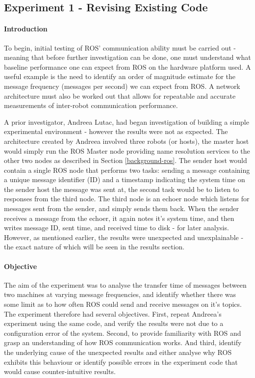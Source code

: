 \documentclass[../dissertation.tex]{subfiles}
\begin{document}
\subsection{Experiment 1 - Revising Existing Code}
\label{exp-1}

\paragraph{Introduction} To begin, initial testing of ROS' communication ability must be carried out - meaning that before further investigation can be done, one must understand what baseline performance one can expect from ROS on the hardware platform used. A useful example is the need to identify an order of magnitude estimate for the message frequency (messages per second) we can expect from ROS. A network architecture must also be worked out that allows for repeatable and accurate measurements of inter-robot communication performance.

A prior investigator, Andreea Lutac, had began investigation of building a simple experimental environment - however the results were not as expected. The architecture created by Andreea involved three robots (or hosts), the master host would simply run the ROS Master node providing name resolution services to the other two nodes as described in Section \ref{background-ros}. The sender host would contain a single ROS node that performs two tasks: sending a message containing a unique message identifier (ID) and a timestamp indicating the system time on the sender host the message was sent at, the second task would be to listen to responses from the third node. The third node is an echoer node which listens for messages sent from the sender, and simply sends them back. When the sender receives a message from the echoer, it again notes it's system time, and then writes message ID, sent time, and received time to disk - for later analysis. However, as mentioned earlier, the results were unexpected and unexplainable - the exact nature of which will be seen in the results section.

\paragraph{Objective} The aim of the experiment was to analyse the transfer time of messages between two machines at varying message frequencies, and identify whether there was some limit as to how often ROS could send and receive messages on it's topics. The experiment therefore had several objectives. First, repeat Andreea's experiment using the same code\cite{Experiment1InitialCode}, and verify the results were not due to a configuration error of the system. Second, to provide familiarity with ROS and grasp an understanding of how ROS communication works. And third, identify the underlying cause of the unexpected results and either analyse why ROS exhibits this behaviour or identify possible errors in the experiment code that would cause counter-intuitive results.
\end{document}
